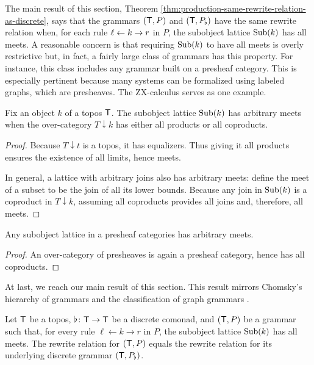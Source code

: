 \documentclass[oneside]{amsart}
\begin{document}
The main result of this section, Theorem
\ref{thm:production-same-rewrite-relation-as-discrete},
says that the grammars $ ( \mathsf{T},P ) $ and
$ ( \mathsf{T},P_\flat ) $ have the same rewrite relation
when, for each rule $ \ell \leftarrow k \to r $ in $ P $,
the subobject lattice $ \operatorname{Sub}(k) $ has all meets. A
reasonable concern is that requiring $ \operatorname{Sub}(k) $
to have all meets is overly restrictive but, in
fact, a fairly large class of grammars has this
property. For instance, this class includes any grammar
built on a presheaf category.  This is especially
pertinent because many systems can be formalized
using labeled graphs, which are presheaves. The
ZX-calculus \parencite{ZX} serves as one example.

\begin{proposition}
  \label{thm:subob-arbitrary-meets}
  Fix an object $k$ of a topos $ \mathsf{T} $.  The subobject
  lattice $ \operatorname{Sub} (k) $ has arbitrary meets when the
  over-category $ T \downarrow k $ has either all products or all coproducts.
\end{proposition}

\begin{proof}
  Because $ T \downarrow t $ is a topos, it has
  equalizers. Thus giving it all products ensures the
  existence of all limits, hence meets.

  In general, a lattice with arbitrary joins also has
  arbitrary meets: define the meet of a subset to be
  the join of all its lower bounds. Because any join in
  $ \operatorname{Sub} (k) $ is a coproduct in $ T \downarrow k $,
  assuming all coproducts provides all joins and, therefore,
  all meets.  
\end{proof}

\begin{corollary}
  Any subobject lattice in a presheaf categories has
  arbitrary meets.  
\end{corollary}

\begin{proof}
  An over-category of presheaves is again a presheaf
  category, hence has all coproducts.  
\end{proof}

At last, we reach our main result of this section.
This result mirrors Chomsky's hierarchy of
grammars \parencite{Chomsky} and the classification of
graph grammars \parencite[Prop.~3.3]{Ehrig_GraphGram}.

\begin{theorem}
  \label{thm:production-same-rewrite-relation-as-discrete}  
  Let $ \mathsf{T} $ be a topos, $ \flat \colon \mathsf{T} \to \mathsf{T} $
  be a discrete comonad, and $ ( \mathsf{T} , P ) $ be a
  grammar such that, for every rule
  $ \ell \gets k \to r $ in $ P $, the subobject
  lattice $ \operatorname{Sub} (k) $ has all meets. The rewrite
  relation for $ ( \mathsf{T} , P ) $ equals the rewrite
  relation for its underlying discrete grammar
  $ ( \mathsf{T},P_\flat ) $.
\end{theorem}
\end{document}
